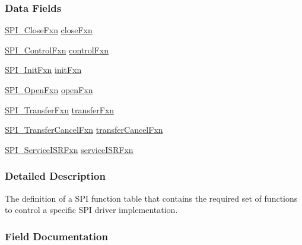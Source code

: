 \subsubsection*{Data Fields}
\begin{DoxyCompactItemize}
\item 
\hyperlink{_s_p_i_8h_aa361d580eb0a5a052d0a1403e0aa5746}{S\+P\+I\+\_\+\+Close\+Fxn} \hyperlink{struct_s_p_i___fxn_table_a4cfaf232f1b8c27f570a7e48f31cdffd}{close\+Fxn}
\item 
\hyperlink{_s_p_i_8h_a48e6e65aa93fbcb2fd2c361e6ec25288}{S\+P\+I\+\_\+\+Control\+Fxn} \hyperlink{struct_s_p_i___fxn_table_a8823765c2e1d303e18da6bec1a432210}{control\+Fxn}
\item 
\hyperlink{_s_p_i_8h_aa3b32db8f017fd0ce92bf46a089659e6}{S\+P\+I\+\_\+\+Init\+Fxn} \hyperlink{struct_s_p_i___fxn_table_aa4a0b45347320aed418d45cdb6609664}{init\+Fxn}
\item 
\hyperlink{_s_p_i_8h_a7e0786f4c1487f9daec49adbc3ac1cf5}{S\+P\+I\+\_\+\+Open\+Fxn} \hyperlink{struct_s_p_i___fxn_table_a938876d892f41db4a3837f93e1ef04c0}{open\+Fxn}
\item 
\hyperlink{_s_p_i_8h_a470d264d053b30edb0aaafcafd335c26}{S\+P\+I\+\_\+\+Transfer\+Fxn} \hyperlink{struct_s_p_i___fxn_table_ae4294e8e6273b581459432386439ca88}{transfer\+Fxn}
\item 
\hyperlink{_s_p_i_8h_a33f5b214451ac89ea462083eeba0bf8c}{S\+P\+I\+\_\+\+Transfer\+Cancel\+Fxn} \hyperlink{struct_s_p_i___fxn_table_a50f7f21536780c912dedf32c0918034c}{transfer\+Cancel\+Fxn}
\item 
\hyperlink{_s_p_i_8h_aeb15890517783b3b646a36a76dbe2070}{S\+P\+I\+\_\+\+Service\+I\+S\+R\+Fxn} \hyperlink{struct_s_p_i___fxn_table_a258c209814c001c5033463a2cb9cb9dd}{service\+I\+S\+R\+Fxn}
\end{DoxyCompactItemize}


\subsubsection{Detailed Description}
The definition of a S\+P\+I function table that contains the required set of functions to control a specific S\+P\+I driver implementation. 

\subsubsection{Field Documentation}
